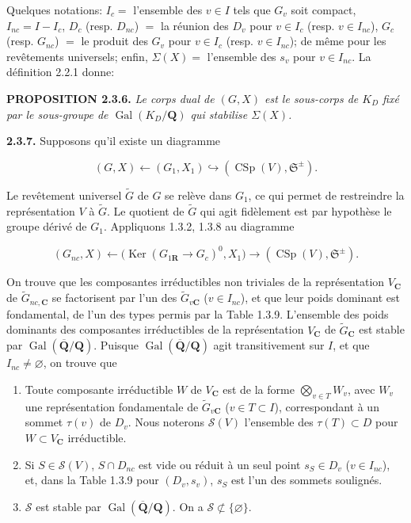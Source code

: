 \documentclass[10pt,a4paper]{article}
\newcommand{\SourcePage}[2]{\clearpage\setcounter{page}{#2}\typeout{D031_SOURCE_PAGE physical=#1 printed=#2}}
\begin{document}
Quelques notations: \(I_c=\) l'ensemble des \(v\in I\) tels que \(G_v\) soit compact, \(I_{nc}=I-I_c\), \(D_c\) (resp. \(D_{nc}\)) \(=\) la réunion des \(D_v\) pour \(v\in I_c\) (resp. \(v\in I_{nc}\)), \(G_c\) (resp. \(G_{nc}\)) \(=\) le produit des \(G_v\) pour \(v\in I_c\) (resp. \(v\in I_{nc}\)); de même pour les revêtements universels; enfin, \(\Sigma(X)=\) l'ensemble des \(s_v\) pour \(v\in I_{nc}\). La définition 2.2.1 donne:

\SourcePage{25}{271}
\textbf{PROPOSITION 2.3.6.} \emph{Le corps dual de \((G,X)\) est le sous-corps de \(K_D\) fixé par le sous-groupe de \(\operatorname{Gal}(K_D/\mathbf Q)\) qui stabilise \(\Sigma(X)\).}

\textbf{2.3.7.} Supposons qu'il existe un diagramme

\[
(G,X)\longleftarrow(G_1,X_1)\hookrightarrow(\operatorname{CSp}(V),\mathfrak S^{\pm}). \tag{2.3.7.1}
\]

Le revêtement universel \(\widetilde G\) de \(G\) se relève dans \(G_1\), ce qui permet de restreindre la représentation \(V\) à \(\widetilde G\). Le quotient de \(\widetilde G\) qui agit fidèlement est par hypothèse le groupe dérivé de \(G_1\). Appliquons 1.3.2, 1.3.8 au diagramme

\[
(G_{nc},X)\longleftarrow\bigl(\operatorname{Ker}(G_{1\mathbf R}\longrightarrow G_c)^0,X_1\bigr)\longrightarrow(\operatorname{CSp}(V),\mathfrak S^{\pm}).
\]

On trouve que les composantes irréductibles non triviales de la représentation \(V_{\mathbf C}\) de \(\widetilde G_{nc,\mathbf C}\) se factorisent par l'un des \(\widetilde G_{v\mathbf C}\) (\(v\in I_{nc}\)), et que leur poids dominant est fondamental, de l'un des types permis par la Table 1.3.9. L'ensemble des poids dominants des composantes irréductibles de la représentation \(V_{\mathbf C}\) de \(\widetilde G_{\mathbf C}\) est stable par \(\operatorname{Gal}(\overline{\mathbf Q}/\mathbf Q)\). Puisque \(\operatorname{Gal}(\overline{\mathbf Q}/\mathbf Q)\) agit transitivement sur \(I\), et que \(I_{nc}\ne\varnothing\), on trouve que

\begin{enumerate}
\def\labelenumi{(\alph{enumi})}
\item
  Toute composante irréductible \(W\) de \(V_{\mathbf C}\) est de la forme \(\bigotimes_{v\in T}W_v\), avec \(W_v\) une représentation fondamentale de \(\widetilde G_{v\mathbf C}\) (\(v\in T\subset I\)), correspondant à un sommet \(\tau(v)\) de \(D_v\). Nous noterons \(\mathscr S(V)\) l'ensemble des \(\tau(T)\subset D\) pour \(W\subset V_{\mathbf C}\) irréductible.
\item
  Si \(S\in\mathscr S(V)\), \(S\cap D_{nc}\) est vide ou réduit à un seul point \(s_S\in D_v\) (\(v\in I_{nc}\)), et, dans la Table 1.3.9 pour \((D_v,s_v)\), \(s_S\) est l'un des sommets soulignés.
\item
  \(\mathscr S\) est stable par \(\operatorname{Gal}(\overline{\mathbf Q}/\mathbf Q)\). On a \(\mathscr S\not\subset\{\varnothing\}\).
\end{enumerate}
\end{document}
